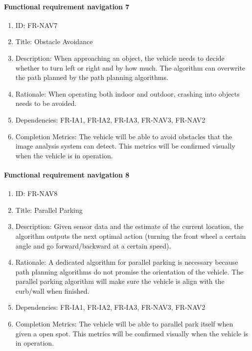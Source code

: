 \documentclass[compsoc,draftclsnofoot,onecolumn,10pt]{IEEEtran}
\begin{document}
	\paragraph{Functional requirement navigation 7}
		\begin{enumerate}
			\item ID: FR-NAV7
			\item Title: Obstacle Avoidance
			\item Description: When approaching an object, the vehicle needs to decide whether to turn left or right and by how much. The algorithm can overwrite the path planned by the path planning algorithms.
			\item Rationale: When operating both indoor and outdoor, crashing into objects needs to be avoided. 
			\item Dependencies: FR-IA1, FR-IA2, FR-IA3, FR-NAV3, FR-NAV2
			\item Completion Metrics: The vehicle will be able to avoid obstacles that the image analysis system can detect. This metrics will be confirmed visually when the vehicle is in operation.  
		\end{enumerate}

	\paragraph{Functional requirement navigation 8}
		\begin{enumerate}
			\item ID: FR-NAV8
			\item Title: Parallel Parking
			\item Description: Given sensor data and the estimate of the current location, the algorithm outputs the next optimal action (turning the front wheel a certain angle and go forward/backward at a certain speed).
			\item Rationale: A dedicated algorithm for parallel parking is necessary because path planning algorithms do not promise the orientation of the vehicle. The parallel parking algorithm will make sure the vehicle is align with the curb/wall when finished.
			\item Dependencies: FR-IA1, FR-IA2, FR-IA3, FR-NAV3, FR-NAV2
			\item Completion Metrics: The vehicle will be able to parallel park itself when given a open spot. 
			This metrics will be confirmed visually when the vehicle is in operation.  
		\end{enumerate}		
		
\end{document}
